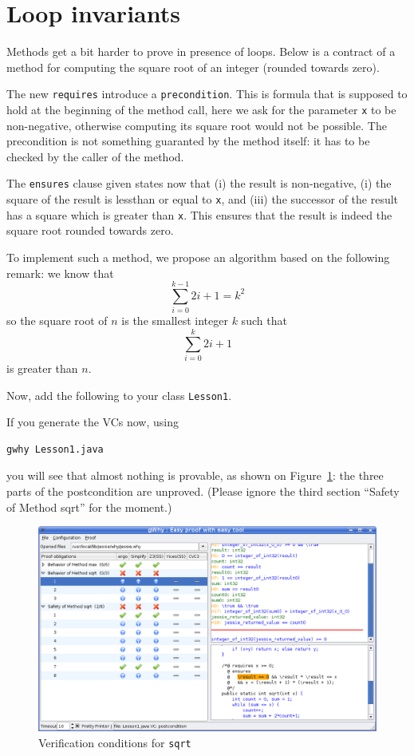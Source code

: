 \documentclass[a4paper,11pt,twoside,openright]{report}
\begin{document}
\section{Loop invariants}

Methods get a bit harder to prove in presence of loops. Below is a
contract of a method for computing the square root of an 
integer (rounded towards zero).

The new \texttt{requires} introduce a \texttt{precondition}. This is
formula that is supposed to hold at the beginning of the method call,
here we ask for the parameter \texttt{x} to be non-negative, otherwise
computing its square root would not be possible. The precondition is
not something guaranted by the method itself: it has to be checked by
the caller of the method.

The \texttt{ensures} clause given states now that (i) the result is
non-negative, (i) the square of the result is lessthan or equal to
\texttt{x}, and (iii) the successor of the result has a square which
is greater than \texttt{x}. This ensures that the result is indeed the
square root rounded towards zero.

To implement such a method, we propose an algorithm based on the
following remark: we know that
\[
\sum_{i=0}^{k-1} 2i+1 = k^2
\]
so the square root of $n$ is the smallest integer $k$ such that
\[
\sum_{i=0}^{k} 2i+1  
\]
is greater than $n$.

Now, add the following to your class \texttt{Lesson1}.

If you generate the VCs now, using
\begin{verbatim}
gwhy Lesson1.java
\end{verbatim}
you will see that almost nothing is provable, as shown on
Figure~\ref{fig:sqrt}: the three parts of the postcondition are
unproved. (Please ignore the third section ``Safety of Method sqrt''
for the moment.)

\begin{figure}[t]
  \begin{center}
    \includegraphics[width=\textwidth]{Lesson1_sqrt.png}
  \end{center}
  \caption{Verification conditions for \texttt{sqrt}}
\label{fig:sqrt}
\hrulefill
\end{figure}
\end{document}
